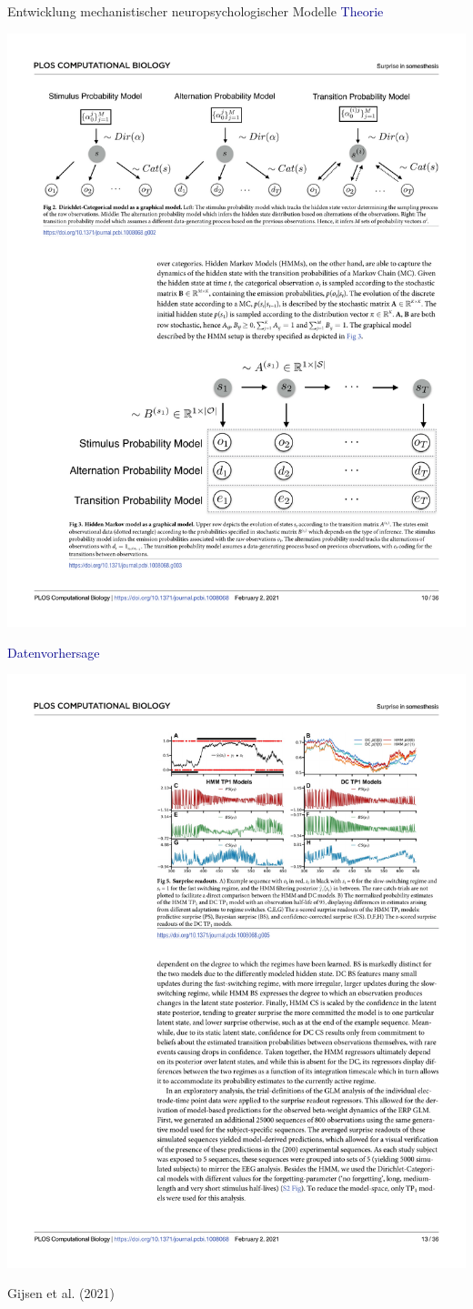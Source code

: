 \documentclass[
  8pt,
  ignorenonframetext,
]{beamer}
\begin{document}
\begin{frame}{Entwicklung mechanistischer neuropsychologischer Modelle}
\protect\hypertarget{entwicklung-mechanistischer-neuropsychologischer-modelle-4}{}
\textcolor{darkblue}{Theorie} \vspace{-2mm}

\begin{center}\includegraphics[width=0.55\linewidth]{2_Abbildungen/pfm_2_gijsen_theorie} \end{center}

\textcolor{darkblue}{Datenvorhersage} \vspace{-2mm}

\begin{center}\includegraphics[width=0.55\linewidth]{2_Abbildungen/pfm_2_gijsen_datenvorhersage} \end{center}

\flushright
\footnotesize

Gijsen et al. (2021)
\end{frame}
\end{document}
